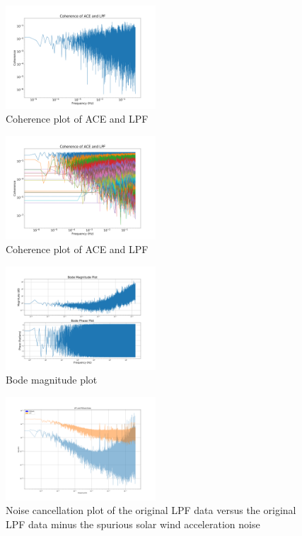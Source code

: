 \documentclass[%
 reprint,
 amsmath,amssymb,
 aps,
]{revtex4-2}
\begin{document}
\begin{figure}[htbp]
\centerline{\includegraphics[width=0.5\textwidth]{ACE_and_LPF_co-1}}
\caption{Coherence plot of ACE and LPF}
\label{fig}
\end{figure}

\begin{figure}[htbp]
\centerline{\includegraphics[width=0.5\textwidth]{ACE_and_LPF_co_2xx15-1}}
\caption{Coherence plot of ACE and LPF}
\label{fig}
\end{figure}


\begin{figure}[htbp]
\centerline{\includegraphics[width=0.5\textwidth]{Bode_plot-1.png}}
\caption{Bode magnitude plot}
\label{fig}
\end{figure}


\begin{figure}[htbp]
\centerline{\includegraphics[width=0.5\textwidth]{LPF_Noise_Cancellation2.png}}
\caption{Noise cancellation plot of the original LPF data versus the original LPF data minus the spurious solar wind acceleration noise}
\label{fig}
\end{figure}
\end{document}

